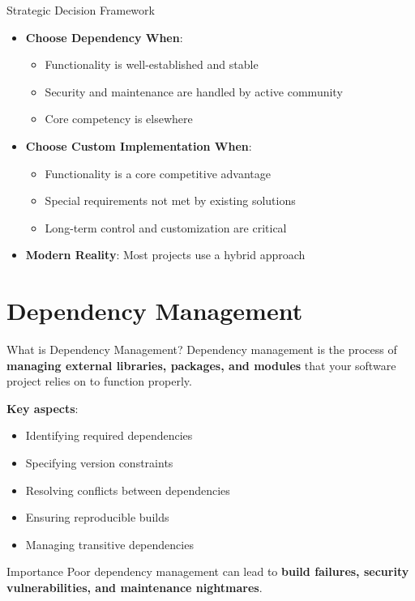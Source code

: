 \documentclass{beamer}
\begin{document}
\begin{frame}[t]{Strategic Decision Framework}
\begin{itemize}
\item \textbf{Choose Dependency When}:
  \begin{itemize}
  \item Functionality is well-established and stable
  \item Security and maintenance are handled by active community
  \item Core competency is elsewhere
  \end{itemize}
\item \textbf{Choose Custom Implementation When}:
  \begin{itemize}
  \item Functionality is a core competitive advantage
  \item Special requirements not met by existing solutions
  \item Long-term control and customization are critical
  \end{itemize}
\item \textbf{Modern Reality}: Most projects use a hybrid approach
\end{itemize}

\end{frame}

\section{Dependency Management}
\begin{frame}[t]{What is Dependency Management?}
Dependency management is the process of \textbf{managing external libraries, packages, and modules} that your software project relies on to function properly.

\bigskip

\textbf{Key aspects}:
\begin{itemize}
\item Identifying required dependencies
\item Specifying version constraints
\item Resolving conflicts between dependencies
\item Ensuring reproducible builds
\item Managing transitive dependencies
\end{itemize}

\bigskip

\begin{alertblock}{Importance}
Poor dependency management can lead to \textbf{build failures, security vulnerabilities, and maintenance nightmares}.
\end{alertblock}
\end{frame}
\end{document}
